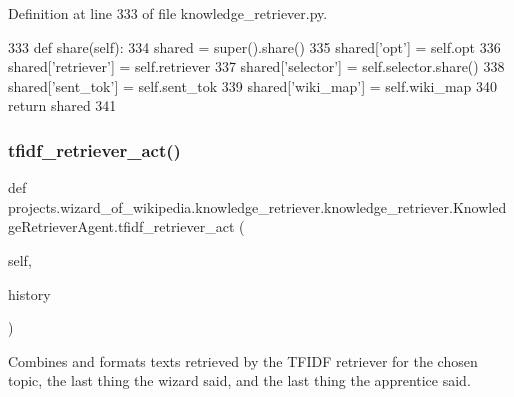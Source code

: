Definition at line 333 of file knowledge\+\_\+retriever.\+py.


\begin{DoxyCode}
333     \textcolor{keyword}{def }share(self):
334         shared = super().share()
335         shared[\textcolor{stringliteral}{'opt'}] = self.opt
336         shared[\textcolor{stringliteral}{'retriever'}] = self.retriever
337         shared[\textcolor{stringliteral}{'selector'}] = self.selector.share()
338         shared[\textcolor{stringliteral}{'sent\_tok'}] = self.sent\_tok
339         shared[\textcolor{stringliteral}{'wiki\_map'}] = self.wiki\_map
340         \textcolor{keywordflow}{return} shared
341 \end{DoxyCode}
\mbox{\label{classprojects_1_1wizard__of__wikipedia_1_1knowledge__retriever_1_1knowledge__retriever_1_1KnowledgeRetrieverAgent_a389261b03820abae81c05211056db463}} 
\subsubsection{\texorpdfstring{tfidf\+\_\+retriever\+\_\+act()}{tfidf\_retriever\_act()}}
{\footnotesize\ttfamily def projects.\+wizard\+\_\+of\+\_\+wikipedia.\+knowledge\+\_\+retriever.\+knowledge\+\_\+retriever.\+Knowledge\+Retriever\+Agent.\+tfidf\+\_\+retriever\+\_\+act (\begin{DoxyParamCaption}\item[{}]{self,  }\item[{}]{history }\end{DoxyParamCaption})}

\begin{DoxyVerb}Combines and formats texts retrieved by the TFIDF retriever for the chosen
topic, the last thing the wizard said, and the last thing the apprentice said.
\end{DoxyVerb}
 

